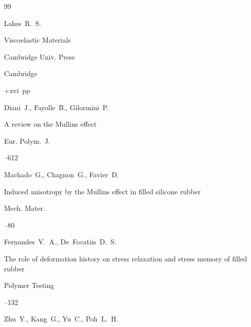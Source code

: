 \begin{thebibliography}{99}

\by Lakes~R.~S.

\book Viscoelastic Materials


\publ Cambridge Univ. Press

\publaddr Cambridge

+xvi~pp \nofrills 







\by Diani~J., Fayolle~B., Gilormini~P.

\paper A review on the Mullins effect

\jour Eur. Polym.~J.



--612







\by Machado~G., Chagnon~G., Favier~D. 

\paper Induced anisotropy by the Mullins effect in filled silicone rubber

\jour Mech. Mater.



--80







\by Fernandes~V.~A., De~Focatiis~D.~S.

\paper The role of deformation history on stress relaxation and stress memory of filled rubber

\jour Polymer Testing



--132







\by Zhu~Y., Kang~G., Yu~C., Poh~L.~H. 


\end{thebibliography}
